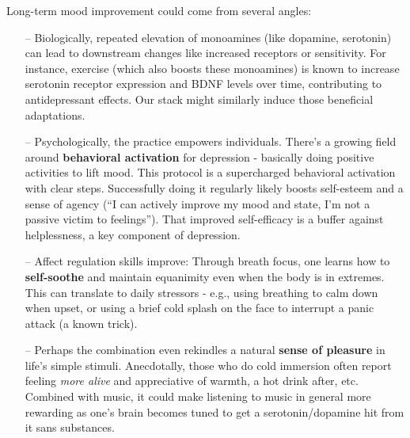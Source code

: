 \documentclass[11pt]{article}
\newcommand{\quotes}[1]{``#1''}
\begin{document}
Long-term mood improvement could come from several angles:
\begin{itemize}
\item[--] Biologically, repeated elevation of monoamines (like dopamine, serotonin) can lead to downstream changes like increased receptors or sensitivity. For instance, exercise (which also boosts these monoamines) is known to increase serotonin receptor expression and BDNF levels over time, contributing to antidepressant effects. Our stack might similarly induce those beneficial adaptations.
\item[--] Psychologically, the practice empowers individuals. There's a growing field around \textbf{behavioral activation} for depression - basically doing positive activities to lift mood. This protocol is a supercharged behavioral activation with clear steps. Successfully doing it regularly likely boosts self-esteem and a sense of agency (\quotes{I can actively improve my mood and state, I'm not a passive victim to feelings}). That improved self-efficacy is a buffer against helplessness, a key component of depression.
\item[--] Affect regulation skills improve: Through breath focus, one learns how to \textbf{self-soothe} and maintain equanimity even when the body is in extremes. This can translate to daily stressors - e.g., using breathing to calm down when upset, or using a brief cold splash on the face to interrupt a panic attack (a known trick).
\item[--] Perhaps the combination even rekindles a natural \textbf{sense of pleasure} in life's simple stimuli. Anecdotally, those who do cold immersion often report feeling \textit{more alive} and appreciative of warmth, a hot drink after, etc. Combined with music, it could make listening to music in general more rewarding as one's brain becomes tuned to get a serotonin/dopamine hit from it sans substances.
\end{itemize}
\end{document}
